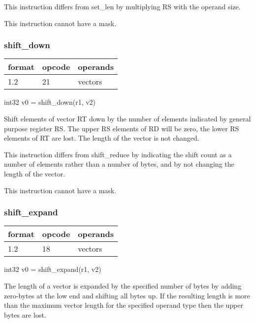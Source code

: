 \documentclass[forwardcom.tex]{subfiles}
\begin{document}
\vspace{2mm}
This instruction differs from set\_len by multiplying RS with the operand size.

This instruction cannot have a mask.


\subsubsection{shift\_down}
\label{table:shiftDownInstruction}
\begin{tabular}{|p{12mm}|p{12mm}|p{110mm}|}
\hline
\bfseries format & \bfseries opcode & \bfseries operands \\ \hline
1.2 & 21 & vectors \\ \hline
\end{tabular}
\vspace{2mm}

int32 v0 = shift\_down(r1, v2)
\vspace{2mm}

Shift elements of vector RT down by the number of elements indicated by general purpose register RS. 
The upper RS elements of RD will be zero, the lower RS elements of RT are lost. The length of the vector is not changed.
\vspace{2mm}

This instruction differs from shift\_reduce by indicating the shift count as a number of elements rather than a number of bytes, and by not changing the length of the vector.
\vspace{2mm}

This instruction cannot have a mask.


\subsubsection{shift\_expand}
\label{table:shiftExpandInstruction}
\begin{tabular}{|p{12mm}|p{12mm}|p{110mm}|}
\hline
\bfseries format & \bfseries opcode & \bfseries operands \\ \hline
1.2 & 18 & vectors \\ \hline
\end{tabular}
\vspace{2mm}

int32 v0 = shift\_expand(r1, v2)
\vspace{2mm}

The length of a vector is expanded by the specified number of bytes by adding zero-bytes at the low end and shifting all bytes up. If the resulting length is more than the maximum vector length for the specified operand type then the upper bytes are lost.
\vspace{2mm}
\end{document}

